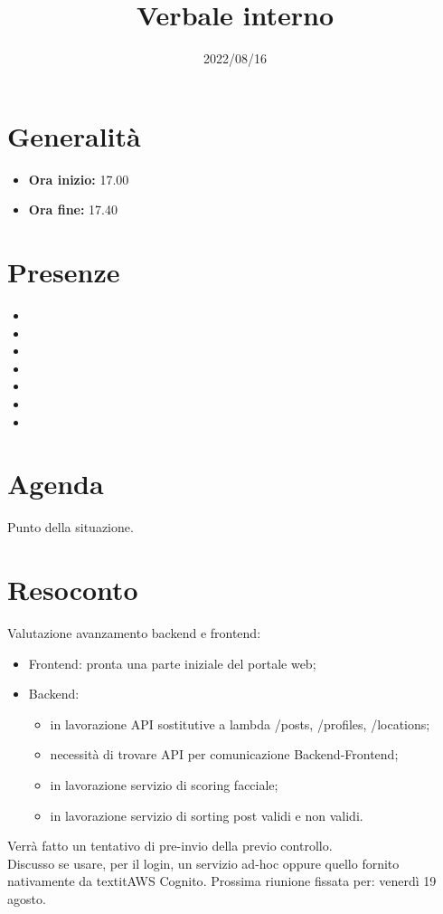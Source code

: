 \documentclass{classes/base}
\title{Verbale interno}
\date{2022/08/16}
\author{\marcob}
\renewcommand{\maketitle}{
    
}
\begin{document}
    \maketitle

    \section*{Generalità}
    \begin{itemize}
        \item \textbf{Ora inizio:} 17.00
        \item \textbf{Ora fine:} 17.40
    \end{itemize}

    \section*{Presenze}
    \begin{itemize}
    	\item \angela
        \item \marcob
        \item \matteo
        \item \marcov
        \item \giulio
        \item \ruth
        \item \tommaso
    \end{itemize}

    \section*{Agenda}
    Punto della situazione.

    \section*{Resoconto}
    Valutazione avanzamento backend e frontend:
    \begin{itemize}
        \item Frontend: pronta una parte iniziale del portale web;
        \item Backend: \begin{itemize}
            \item in lavorazione API sostitutive a lambda /posts, /profiles, /locations;
            \item necessità di trovare API per comunicazione Backend-Frontend;
            \item in lavorazione servizio di scoring facciale;
            \item in lavorazione servizio di sorting post validi e non validi. 
        \end{itemize}
    \end{itemize}
    Verrà fatto un tentativo di pre-invio della \AdR{} previo controllo.\\
    Discusso se usare, per il login, un servizio ad-hoc oppure quello fornito nativamente da textit{AWS Cognito}.\aCapo{}
    Prossima riunione fissata per: venerdì 19 agosto.
\end{document}
